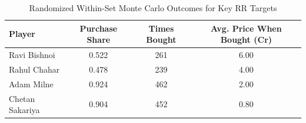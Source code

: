 \begin{table}[H]
\centering
\caption{Randomized Within-Set Monte Carlo Outcomes for Key RR Targets}
\begin{tabular}{lccc}
\toprule
Player & Purchase Share & Times Bought & Avg. Price When Bought (Cr) \\
\midrule
Ravi Bishnoi & 0.522 & 261 & 6.00 \\
Rahul Chahar & 0.478 & 239 & 4.00 \\
Adam Milne & 0.924 & 462 & 2.00 \\
Chetan Sakariya & 0.904 & 452 & 0.80 \\
\bottomrule
\end{tabular}
\end{table}
